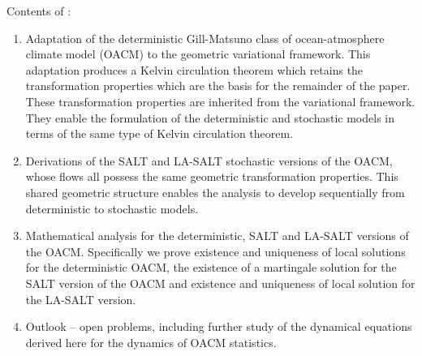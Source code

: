\documentclass[11pt, oneside]{article}   	%
\numberwithin{equation}{section}
\theoremstyle{plain}
\theoremstyle{definition}
\theoremstyle{remark}
\newcommand{\<}{\langle}
\renewcommand{\>}{\rangle}
\begin{document}
Contents of \cite{crisan2023implementation}:
 \begin{enumerate}
  \item
  Adaptation of the deterministic Gill-Matsuno \cite{gill1980some,matsuno1966quasi} class of ocean-atmosphere climate model (OACM) to the geometric variational framework. This adaptation produces a Kelvin circulation theorem which retains the transformation properties which are the basis for the remainder of the paper. These transformation properties are inherited from the variational framework. They enable the formulation of the deterministic and stochastic models in terms of the same type of Kelvin circulation theorem. 
  \item
  Derivations of the SALT and LA-SALT stochastic versions of the OACM, whose flows all possess the same geometric transformation properties. This shared geometric structure enables the analysis to develop sequentially from deterministic to stochastic models.
  \item
  Mathematical analysis for the deterministic, SALT and LA-SALT versions of the OACM. Specifically we prove existence and uniqueness of local solutions for the deterministic  OACM, the existence of a martingale solution 
  for the SALT version of the OACM and existence and uniqueness of local solution for the LA-SALT version. 
  
  \item
  Outlook -- open problems, including further study of the dynamical equations derived here for the dynamics of OACM statistics. 
  \end{enumerate}
 
\color{black} 
  \bigskip
 
\end{document}
